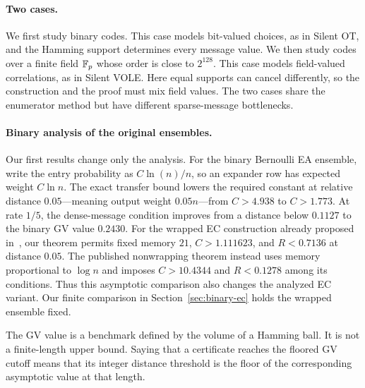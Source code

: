 \paragraph{Two cases.}
We first study binary codes.  This case models bit-valued choices, as in
Silent OT, and the Hamming support determines every message value.  We then
study codes over a finite field $\mathbb F_p$ whose order is close to $2^{128}$.
This case models field-valued correlations, as in Silent VOLE.  Here equal
supports can cancel differently, so the construction and the proof must mix
field values.  The two cases share the enumerator method but have different
sparse-message bottlenecks.

\paragraph{Binary analysis of the original ensembles.}
Our first results change only the analysis.  For the binary Bernoulli EA
ensemble, write the entry probability as $C\ln(n)/n$, so an expander row has
expected weight $C\ln n$.  The exact transfer bound lowers the required
constant at relative distance $0.05$---meaning output weight $0.05n$---from
$C>4.938$ to $C>1.773$.  At rate $1/5$, the
dense-message condition improves from a distance below $0.1127$ to the binary
GV value $0.2430$.
For the wrapped EC construction already proposed in~\cite{EC}, our theorem
permits fixed memory $21$, $C>1.111623$, and $R<0.7136$ at distance $0.05$.
The published nonwrapping theorem instead uses memory proportional to
$\log n$ and imposes $C>10.4344$ and $R<0.1278$ among its conditions.
Thus this asymptotic comparison also changes the analyzed EC variant.
Our finite comparison in Section~\ref{sec:binary-ec} holds the wrapped
ensemble fixed.

The GV value is a benchmark defined by the volume of a Hamming ball.  It is
not a finite-length upper bound.  Saying that a certificate reaches the
floored GV cutoff means that its integer distance threshold is the floor of
the corresponding asymptotic value at that length.

